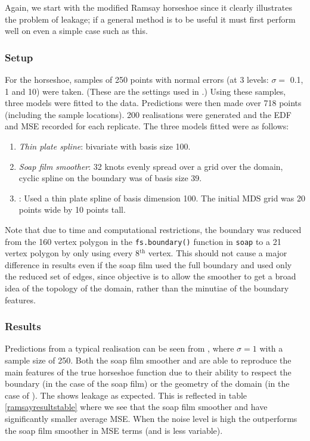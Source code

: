 Again, we start with the modified Ramsay horseshoe since it clearly illustrates the problem of leakage; if a general method is to be useful it must first perform well on even a simple case such as this.

\subsubsection{Setup}

For the horseshoe, samples of 250 points with normal errors (at 3 levels:  $\sigma= $ 0.1, 1 and 10) were taken. (These are the settings used in \cite{soap}.) Using these samples, three models were fitted to the data. Predictions were then made over 718 points (including the sample locations). 200 realisations were generated and the EDF and MSE recorded for each replicate. The three models fitted were as follows:

\begin{enumerate}
\item \emph{Thin plate spline}: bivariate \tprs  with basis size 100.
\item \emph{Soap film smoother}: 32 knots evenly spread over a grid over the domain, cyclic spline on the boundary was of basis size 39.
\item \emph{\mdsap}: Used a thin plate spline of basis dimension 100. The initial MDS grid was 20 points wide by 10 points tall.
\end{enumerate} 

Note that due to time and computational restrictions, the boundary was reduced from the 160 vertex polygon in the \texttt{fs.boundary()} function in \texttt{soap} to a 21 vertex polygon by only using every 8$^\text{th}$ vertex. This should not cause a major difference in results even if the soap film used the full boundary and \mdsap used only the reduced set of edges, since objective is to allow the smoother to get a broad idea of the topology of the domain, rather than the minutiae of the boundary features.

\subsubsection{Results}

Predictions from a typical realisation can be seen from , where $\sigma=1$ with a sample size of 250. Both the soap film smoother and \mdsap are able to reproduce the main features of the true horseshoe function due to their ability to respect the boundary (in the case of the soap film) or the geometry of the domain (in the case of \mdsap). The \tprs shows leakage as expected. This is reflected in table \ref{ramsayresultstable} where we see that the soap film smoother and \mdsap have significantly smaller average MSE. When the noise level is high the \mdsap outperforms the soap film smoother in MSE terms (and is less variable).


